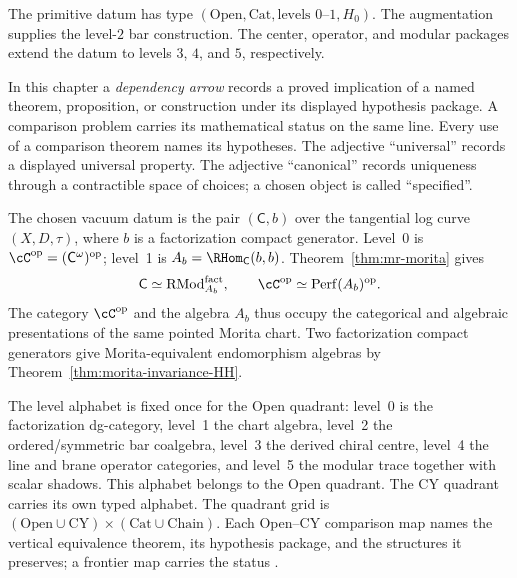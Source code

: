 \begin{remark}
\label{rem:mr-type-signature-datum}
The primitive datum has type
$(\mathrm{Open},\mathrm{Cat},\text{levels }0\text{--}1,H_0)$.
The augmentation supplies the level-$2$ bar construction.  The center,
operator, and modular packages extend the datum to levels $3$, $4$,
and $5$, respectively.
\end{remark}

\begin{definition}
\label{def:mr-dependency-vacuum-level-quadrant-discipline}
In this chapter a \emph{dependency arrow} records a proved implication
of a named theorem, proposition, or construction under its displayed
hypothesis package.  A comparison problem carries its mathematical status
on the same line.  Every use of a comparison theorem names its
hypotheses.  The adjective ``universal'' records a displayed universal
property.  The adjective ``canonical'' records uniqueness through a
contractible space of choices; a chosen object is called
``specified''.

The chosen vacuum datum is the pair $(\mathsf C,b)$ over the
tangential log curve $(X,D,\tau)$, where $b$ is a factorization
compact generator.  Level~0 is
$\cC^\op=(\mathsf C^\omega)^\op$; level~1 is
$A_b=\RHom_{\mathsf C}(b,b)$.  Theorem~\ref{thm:mr-morita} gives
\[
 \mathsf C\simeq\mathrm{RMod}_{A_b}^{\fact},
 \qquad
 \cC^\op\simeq\mathrm{Perf}(A_b)^\op .
\]
The category $\cC^\op$ and the algebra $A_b$ thus occupy the
categorical and algebraic presentations of the same pointed Morita
chart.  Two factorization compact generators give Morita-equivalent
endomorphism algebras by
Theorem~\ref{thm:morita-invariance-HH}.

The level alphabet is fixed once for the Open quadrant:
level~0 is the factorization dg-category, level~1 the chart algebra,
level~2 the ordered/symmetric bar coalgebra, level~3 the derived
chiral centre, level~4 the line and brane operator categories, and
level~5 the modular trace together with scalar shadows.  This alphabet
belongs to the Open quadrant.  The CY quadrant carries its own typed
alphabet.  The quadrant grid is
$(\mathrm{Open}\cup\mathrm{CY})\times(\mathrm{Cat}\cup
\mathrm{Chain})$.  Each Open--CY comparison map names the vertical
equivalence theorem, its hypothesis package, and the structures it
preserves; a frontier map carries the status
\ClaimStatusConjectured.
\end{definition}


